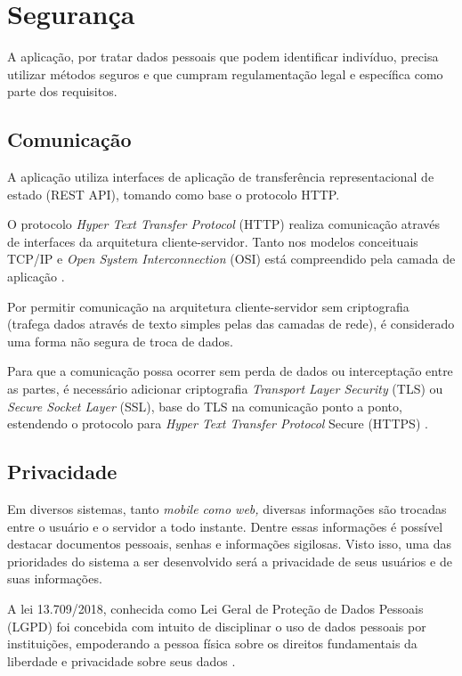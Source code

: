 \documentclass[
    12pt,               %
    openright,          %
    oneside,
    a4paper,            %
    BIBLATEX,           %
    TODO,               %
    english,            %
    brazil              %
    ]{ifsp-spo-inf-ctds}
\begin{document}
    \section{Segurança}
    
        A aplicação, por tratar dados pessoais que podem identificar indivíduo, precisa utilizar métodos seguros e que cumpram regulamentação legal e específica como parte dos requisitos.

        \subsection{Comunicação}
        
            A aplicação utiliza interfaces de aplicação de transferência representacional de estado (REST API), tomando como base o protocolo HTTP.
        
            O protocolo \emph{Hyper Text Transfer Protocol} (HTTP) realiza comunicação através de interfaces da arquitetura cliente-servidor. Tanto nos modelos conceituais TCP/IP e \emph{Open System Interconnection} (OSI) está compreendido pela camada de aplicação .
        
            Por permitir comunicação na arquitetura cliente-servidor sem criptografia (trafega dados através de texto simples pelas das camadas de rede), é considerado uma forma não segura de troca de dados.
            
            Para que a comunicação possa ocorrer sem perda de dados ou interceptação entre as partes, é necessário adicionar criptografia \emph{Transport Layer Security} (TLS) ou \emph{Secure Socket Layer} (SSL), base do TLS na comunicação ponto a ponto, estendendo o protocolo para \emph{Hyper Text Transfer Protocol} Secure (HTTPS) .

        \subsection{Privacidade}
        
            Em diversos sistemas, tanto \emph{mobile como web,} diversas informações são trocadas entre o usuário e o servidor a todo instante. Dentre essas informações é possível destacar documentos pessoais, senhas e informações sigilosas. Visto isso, uma das prioridades do sistema a ser desenvolvido será a privacidade de seus usuários e de suas informações.
        
            A lei 13.709/2018, conhecida como Lei Geral de Proteção de Dados Pessoais (LGPD) foi concebida com intuito de disciplinar o uso de dados pessoais por instituições, empoderando a pessoa física sobre os direitos fundamentais da liberdade e privacidade sobre seus dados .
            
\end{document}
